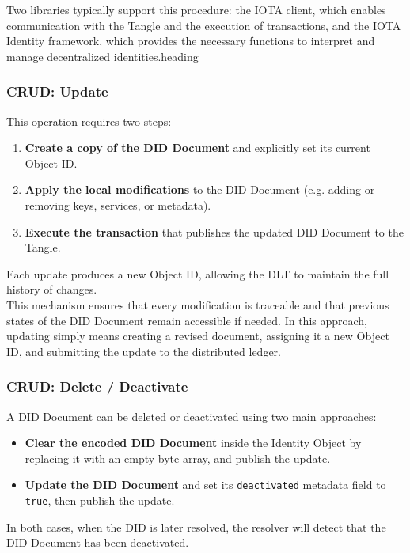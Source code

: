 \noindent
Two libraries typically support this procedure: the IOTA client, which enables communication with the Tangle and the execution of transactions, and the IOTA Identity framework, which provides the necessary functions to interpret and manage decentralized identities.heading
\bigskip

\subsubsection*{CRUD: Update}
This operation requires two steps:
\begin{enumerate}
    \item \textbf{Create a copy of the DID Document} and explicitly set its current Object ID.
    \item \textbf{Apply the local modifications} to the DID Document (e.g. adding or removing keys, services, or metadata).
    \item \textbf{Execute the transaction} that publishes the updated DID Document to the Tangle.
\end{enumerate}

\noindent
Each update produces a new Object ID, allowing the DLT to maintain the full history of changes.\\
This mechanism ensures that every modification is traceable and that previous states of the DID Document remain accessible if needed. In this approach, updating simply means creating a revised document, assigning it a new Object ID, and submitting the update to the distributed ledger.

\subsubsection*{CRUD: Delete / Deactivate}

A DID Document can be deleted or deactivated using two main approaches:
\begin{itemize}
    \item \textbf{Clear the encoded DID Document} inside the Identity Object by replacing it with an empty byte array, and publish the update.
    \item \textbf{Update the DID Document} and set its \texttt{deactivated} metadata field to \texttt{true}, then publish the update.
\end{itemize}

\noindent
In both cases, when the DID is later resolved, the resolver will detect that the DID Document has been deactivated.
\medskip

